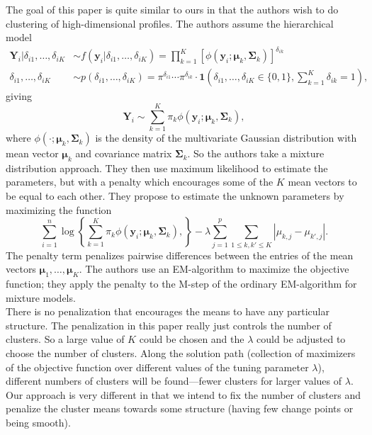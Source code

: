 \documentclass[10pt]{article}
\begin{document}
\begin{enumerate}
    The goal of this paper is quite similar to ours in that the authors wish to do clustering of high-dimensional profiles.  The authors assume the hierarchical model
    \begin{align*}
    \mathbf{Y}_i | \delta_{i1},\dots,\delta_{iK} &\sim f(\mathbf{y}_i|\delta_{i1},\dots,\delta_{iK}) = \prod_{k=1}^K \left[\phi(\mathbf{y}_i;\boldsymbol{\mu}_{k},\boldsymbol{\Sigma}_k)\right]^{\delta_{ik}}\\
    \delta_{i1},\dots,\delta_{iK} &\sim p(\delta_{i1},\dots,\delta_{iK}) = \pi^{\delta_{i1}} \cdots \pi^{\delta_{ik}} \cdot \mathbf{1}(\delta_{i1},\dots,\delta_{iK} \in  \{0,1\}, \sum_{k=1}^K \delta_{ik} = 1),
    \end{align*}
    giving
    \[
    \mathbf{Y}_i \sim \sum_{k=1}^K \pi_k \phi(\mathbf{y}_i;\boldsymbol{\mu}_{k},\boldsymbol{\Sigma}_k),
    \]
    where $\phi(\cdot ;\boldsymbol{\mu}_{k},\boldsymbol{\Sigma}_k)$ is the density of the multivariate Gaussian distribution with mean vector $\boldsymbol{\mu}_{k}$ and covariance matrix $\boldsymbol{\Sigma}_k$.  So the authors take a mixture distribution approach.  They then use maximum likelihood to estimate the parameters, but with a penalty which encourages some of the $K$ mean vectors to be equal to each other.   They propose to estimate the unknown parameters by maximizing the function
    \[
    \sum_{i=1}^n \log\left\{\sum_{k=1}^K \pi_k \phi(\mathbf{y}_i;\boldsymbol{\mu}_{k},\boldsymbol{\Sigma}_k), \right\} - \lambda \sum_{j=1}^p \sum_{1 \leq k , k' \leq K}|\mu_{k,j} - \mu_{k',j}|.
    \]
    The penalty term penalizes pairwise differences between the entries of the mean vectors $\boldsymbol{\mu}_1,\dots,\boldsymbol{\mu}_K$.  The authors use an EM-algorithm to maximize the objective function; they apply the penalty to the M-step of the ordinary EM-algorithm for mixture models.\\
    
    There is no penalization that encourages the means to have any particular structure.  The penalization in this paper really just controls the number of clusters.   So a large value of $K$ could be chosen and the $\lambda$  could be adjusted to choose the number of clusters.  Along the solution path (collection of maximizers of the objective function over different values of the tuning parameter $\lambda$), different numbers of clusters will be found---fewer clusters for larger values of $\lambda$.\\
    
    Our approach is very different in that we intend to fix the number of clusters and penalize the cluster means towards some structure (having few change points or being smooth).

    \end{enumerate}
\end{document}
